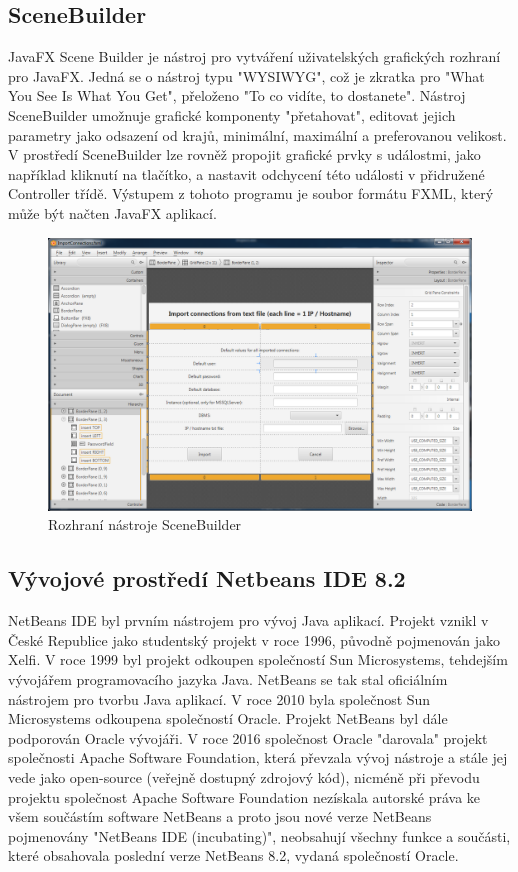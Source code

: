 \documentclass[czech,bachelor,public,dept460,male,cpdeclaration,twoside]{diploma}
\begin{document}
\subsection{SceneBuilder}
JavaFX Scene Builder je nástroj pro vytváření uživatelských grafických rozhraní pro JavaFX. Jedná se o nástroj typu "WYSIWYG", což je zkratka pro "What You See Is What You Get", přeloženo "To co vidíte, to dostanete". Nástroj SceneBuilder umožnuje grafické komponenty "přetahovat", editovat jejich parametry jako odsazení od krajů, minimální, maximální a preferovanou velikost. V prostředí SceneBuilder lze rovněž propojit grafické prvky s událostmi, jako například kliknutí na tlačítko, a nastavit odchycení této události v přidružené Controller třídě. Výstupem z tohoto programu je soubor formátu FXML, který může být načten JavaFX aplikací.
\cite{scenebuilder}

\begin{figure}[!h]\centering\includegraphics[width=1.0\textwidth]{Figures/SceneBuilder.png}\caption{Rozhraní nástroje SceneBuilder}
\end{figure}

\subsection{Vývojové prostředí Netbeans IDE 8.2} \label{netbeans}
NetBeans IDE byl prvním nástrojem pro vývoj Java aplikací. Projekt vznikl v České Republice jako studentský projekt v roce 1996, původně pojmenován jako Xelfi. V roce 1999 byl projekt odkoupen společností Sun Microsystems, tehdejším vývojářem programovacího jazyka Java. NetBeans se tak stal oficiálním nástrojem pro tvorbu Java aplikací. V roce 2010 byla společnost Sun Microsystems odkoupena společností Oracle. Projekt NetBeans byl dále podporován Oracle vývojáři. V roce 2016 společnost Oracle "darovala" projekt společnosti Apache Software Foundation, která převzala vývoj nástroje a stále jej vede jako open-source (veřejně dostupný zdrojový kód), nicméně při převodu projektu společnost Apache Software Foundation nezískala autorské práva ke všem součástím software NetBeans a proto jsou nové verze NetBeans pojmenovány "NetBeans IDE (incubating)", neobsahují všechny funkce a součásti, které obsahovala poslední verze NetBeans 8.2, vydaná společností Oracle. \cite{netbeans}
\end{document}
